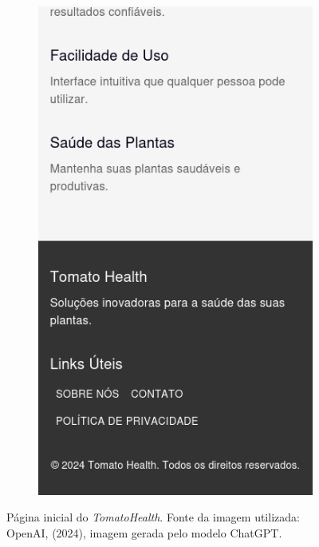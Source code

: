 \begin{figure}[p]
\begin{subfigure}{0.45\textwidth}
        \includegraphics[width=\linewidth, height=0.4\textheight, keepaspectratio]{images/homepage4.png}
    \end{subfigure}
    
    \caption{Página inicial do \emph{TomatoHealth}. Fonte da imagem utilizada: OpenAI, (2024), imagem gerada pelo modelo ChatGPT.}        \label{fig:homepage}

\end{figure}

